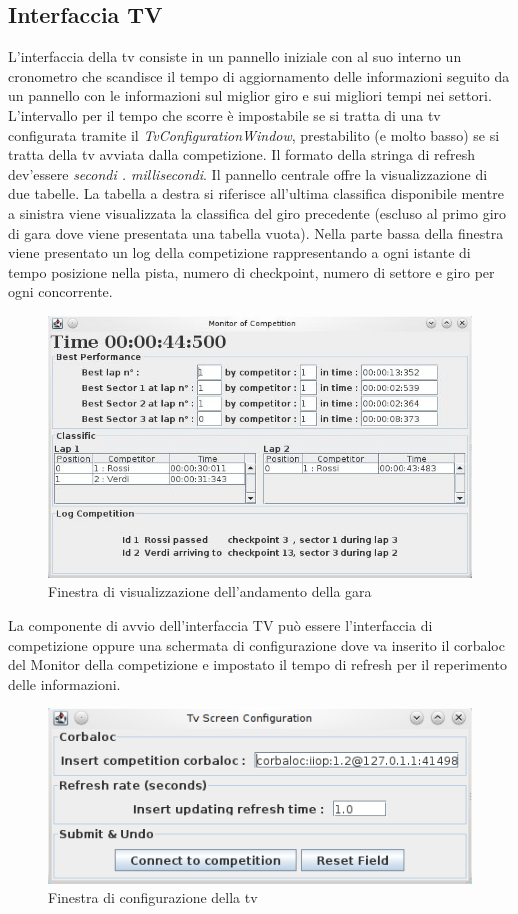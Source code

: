 \subsection{Interfaccia TV}
\label{interfacciaTv}
L'interfaccia della tv consiste in un pannello iniziale con al suo interno un cronometro che scandisce il tempo di aggiornamento delle informazioni seguito da un pannello con le informazioni sul miglior giro e sui migliori tempi nei settori.
L'intervallo per il tempo che scorre \`{e} impostabile se si tratta di una tv configurata tramite il \emph{TvConfigurationWindow}, prestabilito (e molto basso) se si tratta della tv avviata dalla competizione. Il formato della stringa di refresh dev'essere \emph{secondi . millisecondi}.
Il pannello centrale offre la visualizzazione di due tabelle. La tabella a destra si riferisce all'ultima classifica disponibile mentre a sinistra viene visualizzata la classifica del giro precedente (escluso al primo giro di gara dove viene presentata una tabella vuota).
Nella parte bassa della finestra viene presentato un log della competizione rappresentando a ogni istante di tempo posizione nella pista, numero di checkpoint, numero di settore e giro per ogni concorrente.
\begin{center}
\begin{figure}[h]
	\includegraphics[scale=0.75]{img/ScreenshotRelazione/screenTvCompetition.jpg}
	\caption{Finestra di visualizzazione dell'andamento della gara}
\end{figure}
\end{center}
La componente di avvio dell'interfaccia TV pu\`{o} essere l'interfaccia di competizione oppure una schermata di configurazione dove va inserito il corbaloc del Monitor della competizione e impostato il tempo di refresh per il reperimento delle informazioni.
\begin{center}
\begin{figure}[H]
	\includegraphics[scale=0.75]{img/ScreenshotRelazione/configurationScreen.jpg}
	\caption{Finestra di configurazione della tv}
\end{figure}
\end{center}
